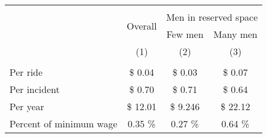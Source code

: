 \begin{tabular}{lccc}
       \hline\hline  \\[-1.8ex] 
                                                       & \multirow{2}{*}{Overall}                                & \multicolumn{2}{c}{Men in reserved space}                                                                                      \\
                                                       &                                                                                 & Few men                                                                & Many men                                                              \\
                                                       & (1)                                                                     & (2)                                                                            & (3)                                                                           \\
       \hline   \\[-1.8ex]
       Per ride                                & \$    0.04    & \$    0.03    & \$    0.07    \\
       Per incident                    & \$    0.70    & \$    0.71    & \$    0.64    \\
       Per year                                & \$   12.01    & \$   9.246    & \$   22.12    \\
       Percent of minimum wage &        0.35 \% &        0.27 \% &        0.64 \% \\
       \hline \hline
\end{tabular}